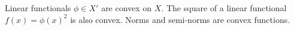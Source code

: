 Linear functionals $\phi \in X'$ are convex on $X$. The square of a linear functional $f(x) = \phi(x)^2$ is also convex. Norms and semi-norms are convex functions.
